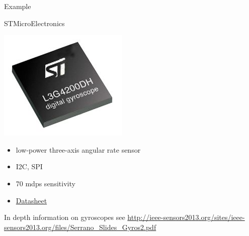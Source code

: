 \documentclass[compress]{beamer}
\begin{document}
\begin{frame}{Example}

    STMicroElectronics

    \begin{center}
        \includegraphics[width=0.3\linewidth]{stm_gyro}
    \end{center}

    \begin{itemize}

        \item
              low-power three-axis angular rate sensor
        \item
              I2C, SPI
        \item
              70 mdps sensitivity
        \item
              \href{http://www.st.com/web/en/resource/technical/document/datasheet/CD00265057.pdf}{Datasheet}
    \end{itemize}

    \small
    In depth information on gyroscopes see \url{http://ieee-sensors2013.org/sites/ieee-sensors2013.org/files/Serrano_Slides_Gyros2.pdf}

\end{frame}
\end{document}
